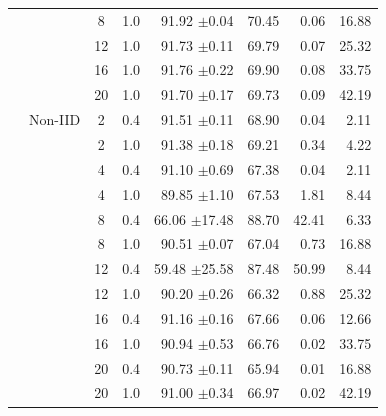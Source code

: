 \begin{table}[htbp]
{\begin{tabular}{llccrrrr}
 &  & 8 & 1.0 & 91.92 {\tiny $\pm$0.04} & 70.45 & 0.06 & 16.88 \\
 &  & 12 & 1.0 & 91.73 {\tiny $\pm$0.11} & 69.79 & 0.07 & 25.32 \\
 &  & 16 & 1.0 & 91.76 {\tiny $\pm$0.22} & 69.90 & 0.08 & 33.75 \\
 &  & 20 & 1.0 & 91.70 {\tiny $\pm$0.17} & 69.73 & 0.09 & 42.19 \\
 & Non-IID & 2 & 0.4 & 91.51 {\tiny $\pm$0.11} & 68.90 & 0.04 & 2.11 \\
 &  & 2 & 1.0 & 91.38 {\tiny $\pm$0.18} & 69.21 & 0.34 & 4.22 \\
 &  & 4 & 0.4 & 91.10 {\tiny $\pm$0.69} & 67.38 & 0.04 & 2.11 \\
 &  & 4 & 1.0 & 89.85 {\tiny $\pm$1.10} & 67.53 & 1.81 & 8.44 \\
 &  & 8 & 0.4 & 66.06 {\tiny $\pm$17.48} & 88.70 & 42.41 & 6.33 \\
 &  & 8 & 1.0 & 90.51 {\tiny $\pm$0.07} & 67.04 & 0.73 & 16.88 \\
 &  & 12 & 0.4 & 59.48 {\tiny $\pm$25.58} & 87.48 & 50.99 & 8.44 \\
 &  & 12 & 1.0 & 90.20 {\tiny $\pm$0.26} & 66.32 & 0.88 & 25.32 \\
 &  & 16 & 0.4 & 91.16 {\tiny $\pm$0.16} & 67.66 & 0.06 & 12.66 \\
 &  & 16 & 1.0 & 90.94 {\tiny $\pm$0.53} & 66.76 & 0.02 & 33.75 \\
 &  & 20 & 0.4 & 90.73 {\tiny $\pm$0.11} & 65.94 & 0.01 & 16.88 \\
 &  & 20 & 1.0 & 91.00 {\tiny $\pm$0.34} & 66.97 & 0.02 & 42.19 \\
\bottomrule
\end{tabular}%
}
\end{table}
